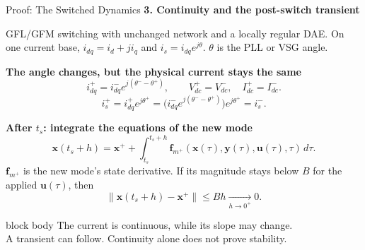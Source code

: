 \documentclass{beamer}
\begin{document}
\begin{frame}{Proof: The Switched Dynamics}
\small
\setlength{\abovedisplayskip}{4pt}
\setlength{\belowdisplayskip}{4pt}
\setlength{\abovedisplayshortskip}{3pt}
\setlength{\belowdisplayshortskip}{3pt}
\vspace*{-0.05cm}
{\color{barblue}\textbf{3. Continuity and the post-switch transient}}\par
{\scriptsize GFL/GFM switching with unchanged network and a locally regular DAE.
On one current base, $i_{dq}=i_d+j i_q$ and $i_s=i_{dq}e^{j\theta}$.
$\theta$ is the PLL or VSG angle.}

\vspace{0.12cm}
\textbf{The angle changes, but the physical current stays the same}
\begin{equation}\label{eq:state-matching}
i_{dq}^{+}=i_{dq}^{-}e^{j(\theta^--\theta^+)},
\qquad V_{dc}^{+}=V_{dc}^{-},\quad I_{dc}^{+}=I_{dc}^{-}.
\end{equation}
\begin{equation}\label{eq:current-matching-proof}
i_s^+=i_{dq}^+e^{j\theta^+}
=\bigl(i_{dq}^-e^{j(\theta^--\theta^+)}\bigr)e^{j\theta^+}
=i_s^- .
\end{equation}

\vspace{0.12cm}
\textbf{After $t_s$: integrate the equations of the new mode}
\begin{equation}\label{eq:post-switch-solution}
\bm x(t_s+h)=\bm x^+
+\int_{t_s}^{t_s+h}\bm f_{m^+}(\bm x(\tau),\bm y(\tau),\bm u(\tau),\tau)\,d\tau .
\end{equation}
{\scriptsize $\bm f_{m^+}$ is the new mode's state derivative.
If its magnitude stays below $B$ for the applied $\bm u(\tau)$, then}
\begin{equation}\label{eq:continuity-bound}
\|\bm x(t_s+h)-\bm x^+\|
\le Bh\xrightarrow[h\to0^+]{}0 .
\end{equation}
\begin{beamercolorbox}[wd=\textwidth,sep=0.12cm]{block body}
{\small The current is continuous, while its slope may change.\\
A transient can follow. Continuity alone does not prove stability.}
\end{beamercolorbox}
\end{frame}
\end{document}
